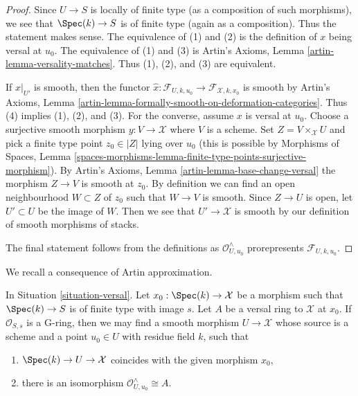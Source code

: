 \begin{proof}
Since $U \to S$ is locally of finite type (as a composition of such morphisms),
we see that $\Spec(k) \to S$ is of finite type (again as a composition).
Thus the statement makes sense. The equivalence of (1) and (2)
is the definition of $x$ being versal at $u_0$.
The equivalence of (1) and (3) is
Artin's Axioms, Lemma \ref{artin-lemma-versality-matches}.
Thus (1), (2), and (3) are equivalent.

\medskip\noindent
If $x|_{U'}$ is smooth, then the functor
$\hat x : \mathcal{F}_{U, k, u_0} \to \mathcal{F}_{\mathcal{X}, k, x_0}$
is smooth by Artin's Axioms, Lemma
\ref{artin-lemma-formally-smooth-on-deformation-categories}.
Thus (4) implies (1), (2), and (3).
For the converse, assume $x$ is versal at $u_0$.
Choose a surjective smooth morphism $y : V \to \mathcal{X}$ where $V$
is a scheme. Set $Z = V \times_\mathcal{X} U$ and pick a finite type
point $z_0 \in |Z|$ lying over $u_0$ (this is possible by
Morphisms of Spaces, Lemma
\ref{spaces-morphisms-lemma-finite-type-points-surjective-morphism}).
By Artin's Axioms, Lemma \ref{artin-lemma-base-change-versal}
the morphism $Z \to V$ is smooth at $z_0$.
By definition we can find an open neighbourhood $W \subset Z$
of $z_0$ such that $W \to V$ is smooth. Since $Z \to U$ is open,
let $U' \subset U$ be the image of $W$. Then we see that
$U' \to \mathcal{X}$ is smooth by our definition of smooth morphisms
of stacks.

\medskip\noindent
The final statement follows from the definitions as
$\mathcal{O}_{U, u_0}^\wedge$
prorepresents $\mathcal{F}_{U, k, u_0}$.
\end{proof}

\noindent
We recall a consequence of Artin approximation.

\begin{lemma}
\label{lemma-Artin-approximation-by-smooth-morphism}
In Situation \ref{situation-versal}. Let $x_0 : \Spec(k) \to \mathcal{X}$
be a morphism such that $\Spec(k) \to S$ is of finite type with image $s$.
Let $A$ be a versal ring to $\mathcal{X}$ at $x_0$.
If $\mathcal{O}_{S, s}$ is a G-ring, then we may find a smooth morphism
$U \to \mathcal{X}$ whose source is a scheme and a point
$u_0 \in U$ with residue field $k$, such that
\begin{enumerate}
\item $\Spec(k) \to U \to \mathcal{X}$ coincides with the given morphism $x_0$,
\item there is an isomorphism $\mathcal{O}_{U, u_0}^\wedge \cong A$.
\end{enumerate}
\end{lemma}

